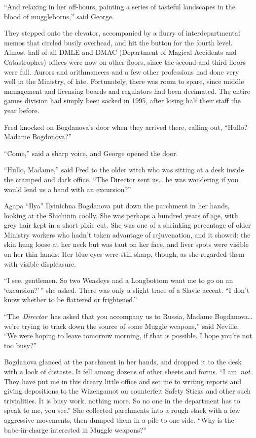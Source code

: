 ``And relaxing in her off-hours, painting a series of tasteful
landscapes in the blood of muggleborns,'' said George.

They stepped onto the elevator, accompanied by a flurry of
interdepartmental memos that circled busily overhead, and hit the button
for the fourth level. Almost half of all DMLE and DMAC (Department of
Magical Accidents and Catastrophes) offices were now on other floors,
since the second and third floors were full. Aurors and arithmancers and
a few other professions had done very well in the Ministry, of late.
Fortunately, there was room to spare, since middle management and
licensing boards and regulators had been decimated. The entire games
division had simply been sacked in 1995, after losing half their staff
the year before.

Fred knocked on Bogdanova's door when they arrived there, calling out,
``Hullo? Madame Bogdonova?''

``Come,'' said a sharp voice, and George opened the door.

``Hullo, Madame,'' said Fred to the older witch who was sitting at a
desk inside the cramped and dark office. ``The Director sent us\ldots{}
he was wondering if you would lend us a hand with an excursion?''

Agapa ``Ilya'' Ilyinichna Bogdanova put down the parchment in her hands,
looking at the Shichinin coolly. She was perhaps a hundred years of age,
with grey hair kept in a short pixie cut. She was one of a shrinking
percentage of older Ministry workers who hadn't taken advantage of
rejuvenation, and it showed: the skin hung loose at her neck but was
taut on her face, and liver spots were visible on her thin hands. Her
blue eyes were still sharp, though, as she regarded them with visible
displeasure.

``I see, gentlemen. So two Weasleys and a Longbottom want me to go on an
`excursion?'\,'' she asked. There was only a slight trace of a Slavic
accent. ``I don't know whether to be flattered or frightened.''

``The~\emph{Director}~has asked that you accompany us to Russia, Madame
Bogdanova\ldots{} we're trying to track down the source of some Muggle
weapons,'' said Neville. ``We were hoping to leave tomorrow morning, if
that is possible. I hope you're not too busy?''

Bogdanova glanced at the parchment in her hands, and dropped it to the
desk with a look of distaste. It fell among dozens of other sheets and
forms. ``I am~\emph{not}. They have put me in this dreary little office
and set me to writing reports and giving depositions to the Wizengamot
on counterfeit Safety Sticks and other such trivialities. It is busy
work, nothing more. So no one in the department has to speak to me, you
see.'' She collected parchments into a rough stack with a few aggressive
movements, then dumped them in a pile to one side. ``Why is the
babe-in-charge interested in Muggle weapons?''

